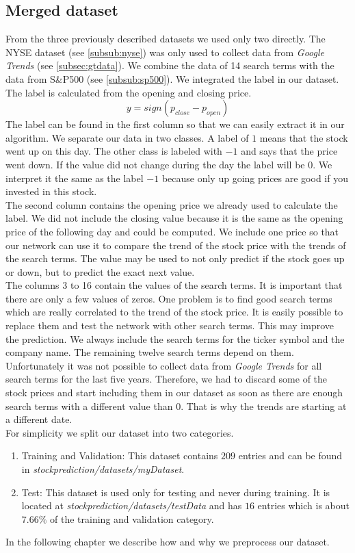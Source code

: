 \subsection{Merged dataset}
\label{subsec:merged}
From the three previously described datasets we used only two directly. The NYSE dataset (see \ref{subsub:nyse}) was only used to collect data from \textit{Google Trends} (see \ref{subsec:gtdata}). We combine the data of 14 search terms with the data from S\&P500 (see \ref{subsub:sp500}). We integrated the label in our dataset. The label is calculated from the opening and closing price.
\begin{equation}
y = sign(p_{close} - p_{open})
\end{equation}
The label can be found in the first column so that we can easily extract it in our algorithm. We separate our data in two classes. A label of $1$ means that the stock went up on this day. The other class is labeled with $-1$ and says that the price went down. If the value did not change during the day the label will be $0$. We interpret it the same as the label $-1$ because only up going prices are good if you invested in this stock.\\
The second column contains the opening price we already used to calculate the label. We did not include the closing value because it is the same as the opening price of the following day and could be computed. We include one price so that our network can use it to compare the trend of the stock price with the trends of the search terms. The value may be used to not only predict if the stock goes up or down, but to predict the exact next value.\\
The columns 3 to 16 contain the values of the search terms. It is important that there are only a few values of zeros. One problem is to find good search terms which are really correlated to the trend of the stock price. It is easily possible to replace them and test the network with other search terms. This may improve the prediction. We always include the search terms for the ticker symbol and the company name. The remaining twelve search terms depend on them.\\
Unfortunately it was not possible to collect data from \textit{Google Trends} for all search terms for the last five years. Therefore, we had to discard some of the stock prices and start including them in our dataset as soon as there are enough search terms with a different value than $0$. That is why the trends are starting at a different date.\\
For simplicity we split our dataset into two categories.
\begin{enumerate}
	\item Training and Validation: This dataset contains $209$ entries and can be found in \mbox{\textit{stockprediction/datasets/myDataset}}.
	\item Test: This dataset is used only for testing and never during training. It is located at \mbox{\textit{stockprediction/datasets/testData}} and has $16$ entries which is about $7.66\%$ of the training and validation category.
\end{enumerate}
In the following chapter we describe how and why we preprocess our dataset.
